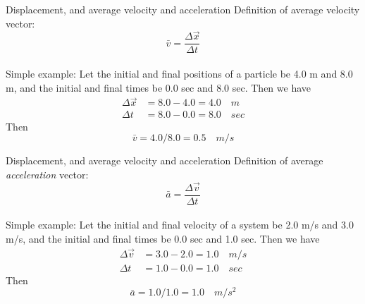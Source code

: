 \documentclass{beamer}
\begin{document}
\begin{frame}{Displacement, and average velocity and acceleration}
Definition of average velocity vector:
\begin{equation}
\boxed{\bar{v} = \frac{\Delta\vec{x}}{\Delta t}}
\end{equation} \\
\vspace{0.5cm}
Simple example: Let the initial and final positions of a particle be 4.0 m and 8.0 m, and the initial and final times be 0.0 sec and 8.0 sec.  Then we have 
\begin{align}
\Delta \vec{x} &= 8.0 - 4.0 = 4.0 \quad m \\
\Delta t &= 8.0 - 0.0 = 8.0 \quad sec
\end{align}
Then
\begin{equation}
\bar{v} = 4.0/8.0 = 0.5 \quad m/s
\end{equation}
\end{frame}

\begin{frame}{Displacement, and average velocity and acceleration}
Definition of average \textit{acceleration} vector:
\begin{equation}
\boxed{\bar{a} = \frac{\Delta \vec{v}}{\Delta t}}
\end{equation} \\
\vspace{0.5cm}
Simple example: Let the initial and final velocity of a system be 2.0 m/s and 3.0 m/s, and the initial and final times be 0.0 sec and 1.0 sec.  Then we have
\begin{align}
\Delta \vec{v} &= 3.0 - 2.0 = 1.0 \quad m/s \\
\Delta t &= 1.0 - 0.0 = 1.0 \quad sec
\end{align}
Then
\begin{equation}
\bar{a} = 1.0/1.0 = 1.0 \quad m/s^2
\end{equation}
\end{frame}
\end{document}
